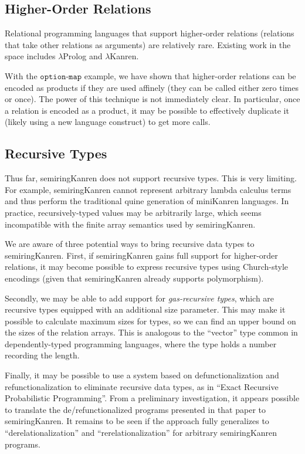 \documentclass{report}
\theoremstyle{definition}
\begin{document}
\subsection{Higher-Order Relations}

Relational programming languages that support higher-order relations (relations that take other relations as arguments) are relatively rare.
Existing work in the space includes \(\lambda\)Prolog\cite{felty1988} and \(\lambda\)Kanren\cite{weixi2020}.

With the \(\texttt{option-map}\) example, we have shown that higher-order relations can be encoded as products if they are used affinely (they can be called either zero times or once).
The power of this technique is not immediately clear.
In particular, once a relation is encoded as a product, it may be possible to effectively duplicate it (likely using a new language construct) to get more calls.

\subsection{Recursive Types}

Thus far, semiringKanren does not support recursive types.
This is very limiting.
For example, semiringKanren cannot represent arbitrary lambda calculus terms and thus perform the traditional quine generation of miniKanren languages.
In practice, recursively-typed values may be arbitrarily large, which seems incompatible with the finite array semantics used by semiringKanren.

We are aware of three potential ways to bring recursive data types to semiringKanren.
First, if semiringKanren gains full support for higher-order relations,
it may become possible to express recursive types using Church-style encodings (given that semiringKanren already supports polymorphism).

Secondly, we may be able to add support for \emph{gas-recursive types}, which are recursive types equipped with an additional size parameter.
This may make it possible to calculate maximum sizes for types, so we can find an upper bound on the sizes of the relation arrays.
This is analogous to the ``vector'' type common in dependently-typed programming languages, where the type holds a number recording the length.

Finally, it may be possible to use a system based on defunctionalization and refunctionalization to eliminate recursive data types, as in ``Exact Recursive Probabilistic Programming''\cite{chiang2023}.
From a preliminary investigation, it appears possible to translate the de/refunctionalized programs presented in that paper to semiringKanren.
It remains to be seen if the approach fully generalizes to ``derelationalization'' and ``rerelationalization'' for arbitrary semiringKanren programs.
\end{document}
